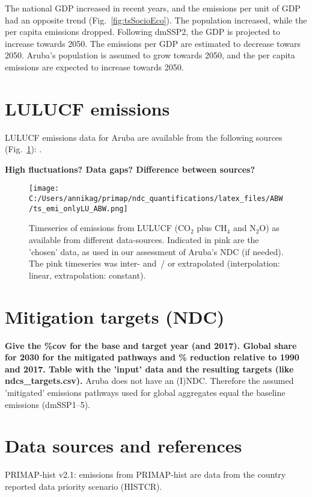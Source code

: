 \documentclass[12pt]{article}
\begin{document}
 The national GDP increased in recent years, and the emissions per unit of GDP had an opposite trend (Fig.~\ref{fig:tsSocioEco}).
 The population increased, while the per capita emissions dropped. 
 Following dmSSP2, the GDP is projected to increase towards 2050. 
 The emissions per GDP are estimated to decrease towars 2050. 
 Aruba's population is assumed to grow towards 2050, and the per capita emissions are expected to increase towards 2050. 

 \section{LULUCF emissions}
 \label{sec:emiLULUCF}
 LULUCF emissions data for Aruba are available from the following sources (Fig.~\ref{fig:tsLULUCF}): .

 \textbf{High fluctuations? Data gaps? Difference between sources?}
 \begin{figure}[htbp]
 \centering
 \texttt{[image: C:/Users/annikag/primap/ndc\_quantifications/latex\_files/ABW/ts\_emi\_onlyLU\_ABW.png]}
 \caption{Timeseries of emissions from LULUCF (CO$_2$ plus CH$_4$ and N$_2$O) as available from different data-sources. 
 Indicated in pink are the 'chosen' data, as used in our assessment of Aruba's NDC (if needed). 
 The pink timeseries was inter- and~/ or extrapolated (interpolation: linear, extrapolation: constant).}
 \label{fig:tsLULUCF}
 \end{figure}

 \section{Mitigation targets (NDC)}
 \label{sec:mitiTars}

 \textbf{ 
 Give the \%cov for the base and target year (and 2017).
 Global share for 2030 for the mitigated pathways and \% reduction relative to 1990 and 2017.
 Table with the 'input' data and the resulting targets (like ndcs\_targets.csv).}
 Aruba does not have an (I)NDC.
 Therefore the assumed 'mitigated' emissions pathways used for global aggregates equal the baseline emissions (dmSSP1--5).

 \section{Data sources and references}
 \label{sec:dataSourcesRefs}
 PRIMAP-hist v2.1: emissions from PRIMAP-hist are data from the country reported data priority scenario (HISTCR).

 
\end{document}
